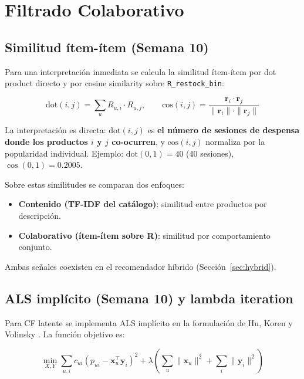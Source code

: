 \documentclass[12pt,a4paper]{article}
\newcommand{\code}[1]{\texttt{\small #1}}
\begin{document}
\section{Filtrado Colaborativo}

\subsection{Similitud ítem-ítem (Semana 10)}

Para una interpretación inmediata se calcula la similitud ítem-ítem por dot product directo y por cosine similarity sobre \code{R\_restock\_bin}:

\[
\text{dot}(i, j) = \sum_{u} R_{u,i} \cdot R_{u,j}, \qquad
\text{cos}(i, j) = \frac{\mathbf{r}_i \cdot \mathbf{r}_j}{\|\mathbf{r}_i\| \cdot \|\mathbf{r}_j\|}
\]

La interpretación es directa: $\text{dot}(i, j)$ es \textbf{el número de sesiones de despensa donde los productos $i$ y $j$ co-ocurren}, y $\text{cos}(i, j)$ normaliza por la popularidad individual. Ejemplo: $\text{dot}(0, 1) = 40$ (40 sesiones), $\cos(0, 1) = 0.2005$.

Sobre estas similitudes se comparan dos enfoques:
\begin{itemize}
    \item \textbf{Contenido (TF-IDF del catálogo)}: similitud entre productos por descripción.
    \item \textbf{Colaborativo (ítem-ítem sobre R)}: similitud por comportamiento conjunto.
\end{itemize}

Ambas señales coexisten en el recomendador híbrido (Sección~\ref{sec:hybrid}).

\subsection{ALS implícito (Semana 10) y lambda iteration}
\label{sec:als}

Para CF latente se implementa ALS implícito en la formulación de Hu, Koren y Volinsky \cite{hu2008collaborative}. La función objetivo es:

\begin{equation}
\min_{X, Y} \sum_{u, i} c_{ui} \left( p_{ui} - \mathbf{x}_u^\top \mathbf{y}_i \right)^2
+ \lambda \left( \sum_u \|\mathbf{x}_u\|^2 + \sum_i \|\mathbf{y}_i\|^2 \right)
\label{eq:als}
\end{equation}
\end{document}
